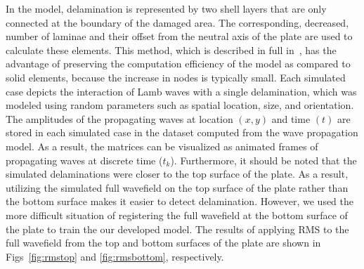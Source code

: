 \documentclass[runningheads]{llncs}
\begin{document}
In the model, delamination is represented by two shell layers that are only connected at the boundary of the damaged area.
The corresponding, decreased, number of laminae and their offset from the neutral axis of the plate are used to calculate these elements.
This method, which is described in full in~\cite{Kudela2009}, has the advantage of preserving the computation efficiency of the model as compared to solid elements, because the increase in nodes is typically small.
Each simulated case depicts the interaction of Lamb waves with a single delamination, which was modeled using random parameters such as spatial location, size, and orientation.
The amplitudes of the propagating waves at location \((x,y)\) and time \((t)\) are stored in each simulated case in the dataset computed from the wave propagation model.
As a result, the matrices can be visualized as animated frames of propagating waves at discrete time (\(t_k\)).
Furthermore, it should be noted that the simulated delaminations were closer to the top surface of the plate.
As a result, utilizing the simulated full wavefield on the top surface of the plate rather than the bottom surface makes it easier to detect delamination.
However, we used the more difficult situation of registering the full wavefield at the bottom surface of the plate to train the our developed model.
The results of applying RMS to the full wavefield from the top and bottom surfaces of the plate are shown in Figs~\ref{fig:rmstop} and \ref{fig:rmsbottom}, respectively.
\end{document}
